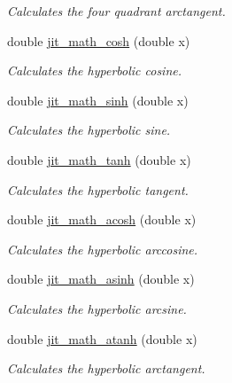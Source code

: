 \begin{DoxyCompactItemize}
\begin{DoxyCompactList}\small\item\em Calculates the four quadrant arctangent. \item\end{DoxyCompactList}\item 
double \hyperlink{group__mathmod_ga23657d5e9c6e97a95e5aaf6484ac4267}{jit\_\-math\_\-cosh} (double x)
\begin{DoxyCompactList}\small\item\em Calculates the hyperbolic cosine. \item\end{DoxyCompactList}\item 
double \hyperlink{group__mathmod_ga38a13525c8bcadee6bd7c96530db65c5}{jit\_\-math\_\-sinh} (double x)
\begin{DoxyCompactList}\small\item\em Calculates the hyperbolic sine. \item\end{DoxyCompactList}\item 
double \hyperlink{group__mathmod_ga3c089e74ef4aa2338189aee123d7e4a8}{jit\_\-math\_\-tanh} (double x)
\begin{DoxyCompactList}\small\item\em Calculates the hyperbolic tangent. \item\end{DoxyCompactList}\item 
double \hyperlink{group__mathmod_ga41dfbcb172c26b6698188c1ae277fbcc}{jit\_\-math\_\-acosh} (double x)
\begin{DoxyCompactList}\small\item\em Calculates the hyperbolic arccosine. \item\end{DoxyCompactList}\item 
double \hyperlink{group__mathmod_gaa3dcf964eeec7ed87744d7c29e4d3659}{jit\_\-math\_\-asinh} (double x)
\begin{DoxyCompactList}\small\item\em Calculates the hyperbolic arcsine. \item\end{DoxyCompactList}\item 
double \hyperlink{group__mathmod_gaae4361174ece63c93cf437e0b8dfffdd}{jit\_\-math\_\-atanh} (double x)
\begin{DoxyCompactList}\small\item\em Calculates the hyperbolic arctangent. \item\end{DoxyCompactList}\item 

\end{DoxyCompactItemize}
